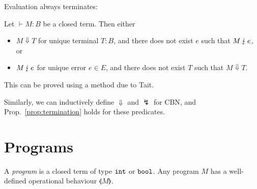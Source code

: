 \documentclass[runningheads,12pt]{llncs}
\newcommand{\opbeh}[1]{\llangle{#1}\rrangle}
\begin{document}


Evaluation always terminates:
\begin{proposition} \label{prop:termination}
  Let $\vdash M : B$ be a closed term.  Then either
  \begin{itemize}
  \item $M \Downarrow T$ for unique terminal $T : B$, and there does not exist $e$ such that $M \,\lightning\, e$, or
 \item $M \,\lightning\, e$ for unique error $e \in E$, and there does not exist $T$ such that $M \Downarrow T$.
  \end{itemize}
\end{proposition}
This can be proved using a method due to Tait.

Similarly, we can inductively define $\Downarrow$ and $\lightning$ for CBN, and Prop.~\ref{prop:termination} holds for these predicates.


\section{Programs}

A \emph{program} is a closed term of type $\mathtt{int}$ or $\mathtt{bool}$.  Any program $M$ has a well-defined operational behaviour $\opbeh{M}$.  
\end{document}
